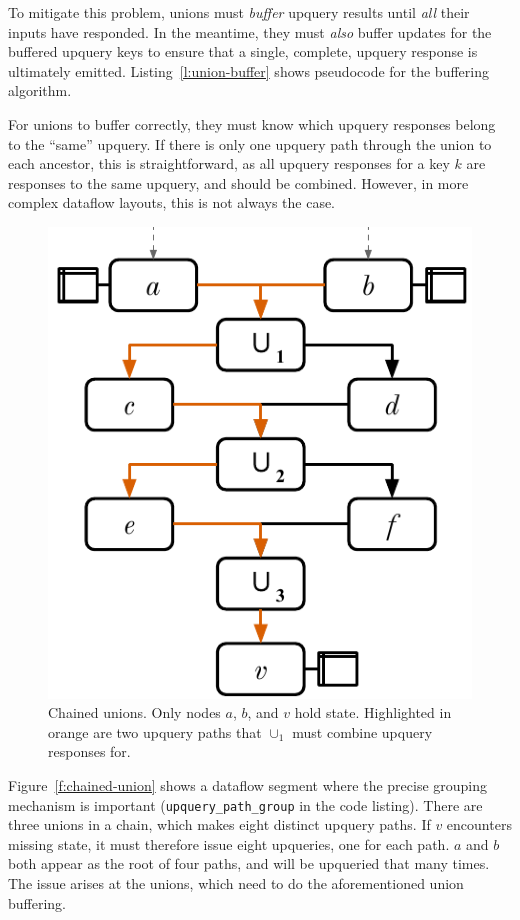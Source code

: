 To mitigate this problem, unions must \textit{buffer} upquery results until
\emph{all} their inputs have responded. In the meantime, they must \emph{also}
buffer updates for the buffered upquery keys to ensure that a single, complete,
upquery response is ultimately emitted. Listing~\vref{l:union-buffer} shows
pseudocode for the buffering algorithm.

For unions to buffer correctly, they must know which upquery responses belong to
the ``same'' upquery. If there is only one upquery path through the union to
each ancestor, this is straightforward, as all upquery responses for a key $k$
are responses to the same upquery, and should be combined. However, in more
complex dataflow layouts, this is not always the case.

\begin{figure}[t]
  \centering
  \includegraphics{diagrams/Chained Unions.pdf}
  \caption{Chained unions. Only nodes $a$, $b$, and $v$ hold state. Highlighted
  in orange are two upquery paths that $\cup_1$ must combine upquery responses
  for.}
  \label{f:chained-union}
\end{figure}

Figure~\vref{f:chained-union} shows a dataflow segment where the precise grouping
mechanism is important (\texttt{upquery\_path\_group} in the code listing).
There are three unions in a chain, which makes eight distinct upquery paths. If
$v$ encounters missing state, it must therefore issue eight upqueries, one for
each path. $a$ and $b$ both appear as the root of four paths, and will be
upqueried that many times. The issue arises at the unions, which need to do
the aforementioned union buffering.

